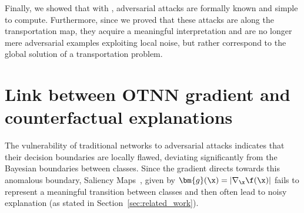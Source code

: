 Finally, we showed that with \otnn, adversarial attacks are formally known and simple to compute.
Furthermore, since we proved that these attacks are along the transportation map, they acquire a meaningful interpretation and are no longer mere adversarial examples exploiting local noise, but rather correspond to the global solution of a transportation problem.
\section{Link between OTNN gradient and counterfactual explanations}

The vulnerability of traditional networks to adversarial attacks indicates that their decision boundaries are locally flawed, deviating significantly from the Bayesian boundaries between classes. Since the gradient directs towards this anomalous boundary, Saliency Maps~\cite{SimonyanVZ13}, given by $ \bm{g}(\x) = | \nabla_{\x} \f(\x) | $ fails to represent a meaningful transition between classes and then often lead to noisy explanation (as stated in Section~\ref{sec:related_work}).


